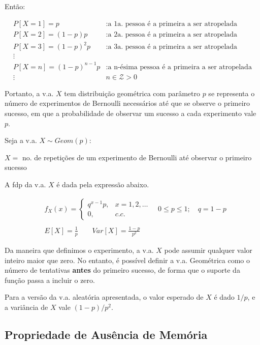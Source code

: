 \documentclass[
]{book}
\theoremstyle{definition}
\theoremstyle{definition}
\theoremstyle{definition}
\theoremstyle{remark}
\begin{document}
Então:

\begin{align*}
&P[X = 1] = p             &: \text{a 1a. pessoa é a primeira a ser atropelada} &\\
&P[X = 2] = (1-p) p       &: \text{a 2a. pessoa é a primeira a ser atropelada}\\
&P[X = 3] = (1-p)^2 p     &: \text{a 3a. pessoa é a primeira a ser atropelada}\\
&\vdots\\
&P[X = n] = (1-p)^{n-1} p &:  \text{a n-ésima pessoa é a primeira a ser atropelada}\\
&\vdots  &n \in \mathcal{Z} > 0
\end{align*}

Portanto, a v.a. \(X\) tem distribuição geométrica com parâmetro \(p\) se
representa o número de experimentos de Bernoulli necessários até que se observe o primeiro sucesso, em que a probabilidade de observar um sucesso a cada experimento vale \(p\).

Seja a v.a. \(X \sim Geom (p)\):

\(X =\) no. de repetições de um experimento de Bernoulli até observar o primeiro sucesso

A fdp da v.a. \(X\) é dada pela expressão abaixo.

\begin{align*}
  &{} f_{X}(x) = \left\{
  \begin{array}{rl}
    q^{x-1}p , & x = 1, 2, \ldots \\
    0,           & c.c.
  \end{array}\right.
  \quad 0 \leq p \leq 1; \quad q = 1-p \\
  \\
  &{} E[X] = \frac{1}{p} \qquad Var[X] = \frac{1-p}{p^2}
\end{align*}

Da maneira que definimos o experimento, a v.a. \(X\) pode assumir qualquer valor inteiro maior que zero. No entanto, é possível definir a v.a. Geométrica como o número de tentativas \textbf{antes} do primeiro sucesso, de forma que o suporte da função passa a incluir o zero.

Para a versão da v.a. aleatória apresentada, o valor esperado de \(X\) é dado \(1/p\), e a variância de \(X\) vale \((1-p)/p^2\).

\hypertarget{propriedade-de-ausuxeancia-de-memuxf3ria}{%
\subsection*{Propriedade de Ausência de Memória}\label{propriedade-de-ausuxeancia-de-memuxf3ria}}
\end{document}
